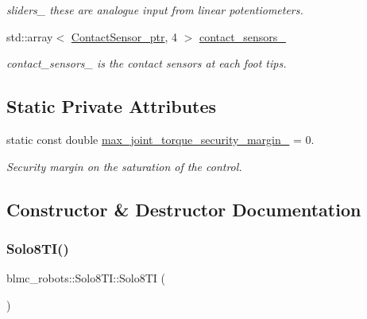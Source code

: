 \begin{DoxyCompactItemize}
\begin{DoxyCompactList}\small\item\em sliders\+\_\+ these are analogue input from linear potentiometers. \end{DoxyCompactList}\item 
std\+::array$<$ \hyperlink{common__header_8hpp_ac78fe5c68e56a3b884117109959e4d58}{Contact\+Sensor\+\_\+ptr}, 4 $>$ \hyperlink{classblmc__robots_1_1Solo8TI_afc6e87d1cec24fd373345e41df874baf}{contact\+\_\+sensors\+\_\+}
\begin{DoxyCompactList}\small\item\em contact\+\_\+sensors\+\_\+ is the contact sensors at each foot tips. \end{DoxyCompactList}\end{DoxyCompactItemize}
\subsection*{Static Private Attributes}
\begin{DoxyCompactItemize}
\item 
static const double \hyperlink{classblmc__robots_1_1Solo8TI_ab2e5018719efa9ea068a4dc870fbb82e}{max\+\_\+joint\+\_\+torque\+\_\+security\+\_\+margin\+\_\+} = 0.
\begin{DoxyCompactList}\small\item\em Security margin on the saturation of the control. \end{DoxyCompactList}\end{DoxyCompactItemize}


\subsection{Constructor \& Destructor Documentation}
\mbox{\label{classblmc__robots_1_1Solo8TI_a5f969910cd1f1b263297e02691a0df5a}} 
\subsubsection{\texorpdfstring{Solo8\+T\+I()}{Solo8TI()}}
{\footnotesize\ttfamily blmc\+\_\+robots\+::\+Solo8\+T\+I\+::\+Solo8\+TI (\begin{DoxyParamCaption}{ }\end{DoxyParamCaption})}



